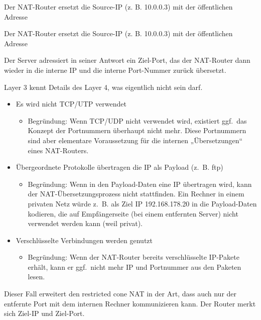 Der NAT-Router ersetzt die Source-IP (z. B. 10.0.0.3) mit der öffentlichen Adresse

Der NAT-Router ersetzt die Source-IP (z. B. 10.0.0.3) mit der öffentlichen Adresse

Der Server adressiert in seiner Antwort ein Ziel-Port, das der NAT-Router dann wieder in die interne IP und die interne Port-Nummer zurück übersetzt.

Layer 3 kennt Details des Layer 4, was eigentlich nicht sein darf.

\begin{itemize}
    \item Es wird nicht TCP/UTP verwendet
    \begin{itemize}
        \item Begründung: Wenn TCP/UDP nicht verwendet wird, existiert ggf.\ das Konzept der Portnummern überhaupt nicht mehr.
        Diese Portnummern sind aber elementare Voraussetzung für die internen „Übersetzungen“ eines NAT-Routers.
    \end{itemize}
    \item Übergeordnete Protokolle übertragen die IP als Payload (z.\ B. ftp)
    \begin{itemize}
        \item Begründung: Wenn in den Payload-Daten eine IP übertragen wird, kann der NAT-Übersetzungsprozess nicht stattfinden.
        Ein Rechner in einem privaten Netz würde z.\ B. als Ziel IP 192.168.178.20 in die Payload-Daten kodieren, die auf Empfängerseite (bei einem entfernten Server) nicht verwendet werden kann (weil privat).
    \end{itemize}
    \item Verschlüsselte Verbindungen werden genutzt
    \begin{itemize}
        \item Begründung: Wenn der NAT-Router bereits verschlüsselte IP-Pakete erhält, kann er ggf.\ nicht mehr IP und Portnummer aus den Paketen lesen.
    \end{itemize}
\end{itemize}

Dieser Fall erweitert den restricted cone NAT in der Art, dass auch nur der entfernte Port mit dem internen Rechner kommunizieren kann.
Der Router merkt sich Ziel-IP und Ziel-Port.